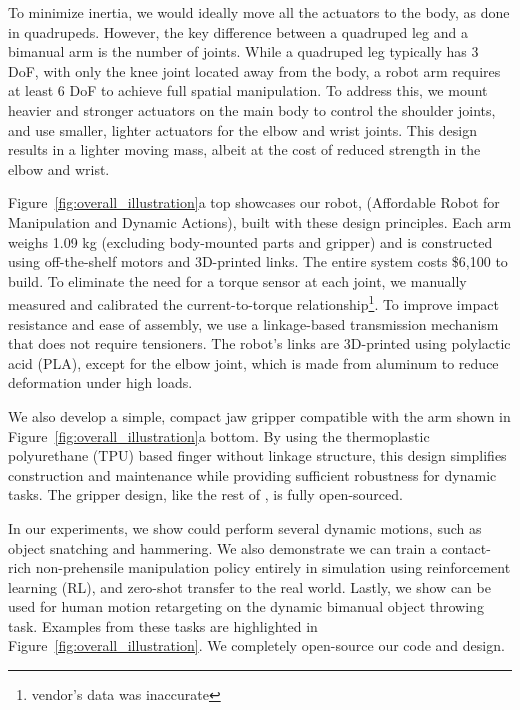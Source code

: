 To minimize inertia, we would ideally move all the actuators to the body, as done in quadrupeds. However, the key difference between a quadruped leg and a bimanual arm is the number of joints. While a quadruped leg typically has 3 DoF, with only the knee joint located away from the body, a robot arm requires at least 6 DoF to achieve full spatial manipulation. To address this, we mount heavier and stronger actuators on the main body to control the shoulder joints, and use smaller, lighter actuators for the elbow and wrist joints. This design results in a lighter moving mass, albeit at the cost of reduced strength in the elbow and wrist.

Figure~\ref{fig:overall_illustration}a top showcases our robot, \robot (Affordable Robot for Manipulation and Dynamic Actions), built with these design principles. Each arm weighs 1.09 kg (excluding body-mounted parts and gripper) and is constructed using off-the-shelf motors and 3D-printed links. The entire system costs \$6,100 to build. To eliminate the need for a torque sensor at each joint, we manually measured and calibrated the current-to-torque relationship\footnote{vendor's data was inaccurate}. To improve impact resistance and ease of assembly, we use a linkage-based transmission mechanism that does not require tensioners. The robot’s links are 3D-printed using polylactic acid (PLA), except for the elbow joint, which is made from aluminum to reduce deformation under high loads. 

We also develop a simple, compact jaw gripper compatible with the arm shown in Figure~\ref{fig:overall_illustration}a bottom.  By using the thermoplastic polyurethane (TPU) based finger without linkage structure, this design simplifies construction and maintenance while providing sufficient robustness for dynamic tasks. The gripper design, like the rest of \robot, is fully open-sourced.%

In our experiments, we show \robot could perform several dynamic motions, such as object snatching and hammering. We also demonstrate we can train a contact-rich non-prehensile manipulation policy entirely in simulation using reinforcement learning (RL), and zero-shot transfer to the real world. Lastly, we show \robot can be used for human motion retargeting on the dynamic bimanual object throwing task. Examples from these tasks are highlighted in Figure~\ref{fig:overall_illustration}. We completely open-source our code and design.